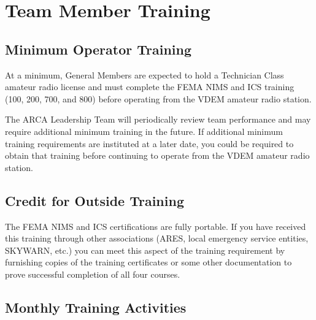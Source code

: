 \documentclass[pdflatex,letterpaper,twoside,12pt]{book}
\begin{document}

\chapter{Team Member Training}

\section{Minimum Operator Training}

At a minimum, General Members are expected to hold a Technician Class amateur radio license and must complete the FEMA NIMS and ICS training (100, 200, 700, and 800) before operating from the VDEM amateur radio station.

The ARCA Leadership Team will periodically review team performance and may require additional minimum training in the future.  If additional minimum training requirements are instituted at a later date, you could be required to obtain that training before continuing to operate from the VDEM amateur radio station.


\section{Credit for Outside Training}

The FEMA NIMS and ICS certifications are fully portable.  If you have received this training through other associations (ARES, local emergency service entities, SKYWARN, etc.) you can meet this aspect of the training requirement by furnishing copies of the training certificates or some other documentation to prove successful completion of all four courses.


\section{Monthly Training Activities}
\end{document}

